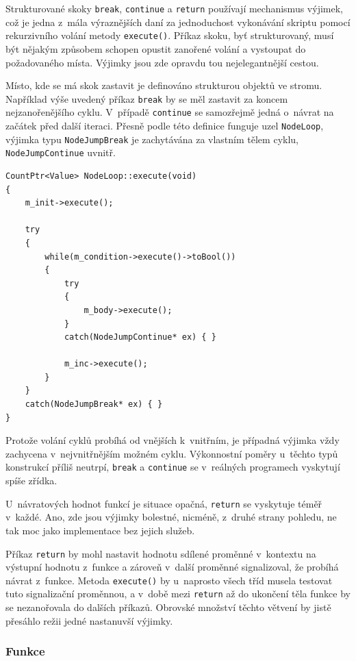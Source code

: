\documentclass[11pt,twoside,a4paper]{book}
\begin{document}
Strukturované skoky \texttt{break}, \texttt{continue} a \texttt{return} používají mechanismus výjimek, což je jedna z~mála výraznějších daní za jednoduchost vykonávání skriptu pomocí rekurzivního volání metody \texttt{execute()}. Příkaz skoku, byť strukturovaný, musí být nějakým způsobem schopen opustit zanořené volání a vystoupat do požadovaného místa. Výjimky jsou zde opravdu tou nejelegantnější cestou.

Místo, kde se má skok zastavit je definováno strukturou objektů ve stromu. Například výše uvedený příkaz \texttt{break} by se měl zastavit za koncem nejzanořenějšího cyklu. V~případě \texttt{continue} se samozřejmě jedná o~návrat na začátek před další iteraci. Přesně podle této definice funguje uzel \texttt{NodeLoop}, výjimka typu \texttt{NodeJumpBreak} je zachytávána za vlastním tělem cyklu, \texttt{NodeJumpContinue} uvnitř.

\begin{verbatim}
CountPtr<Value> NodeLoop::execute(void)
{
    m_init->execute();

    try
    {
        while(m_condition->execute()->toBool())
        {
            try
            {
                m_body->execute();
            }
            catch(NodeJumpContinue* ex) { }

            m_inc->execute();
        }
    }
    catch(NodeJumpBreak* ex) { }
}
\end{verbatim}

Protože volání cyklů probíhá od vnějších k~vnitřním, je případná výjimka vždy zachycena v~nejvnitřnějším možném cyklu. Výkonnostní poměry u~těchto typů konstrukcí příliš neutrpí, \texttt{break} a \texttt{continue} se v~reálných programech vyskytují spíše zřídka.

U~návratových hodnot funkcí je situace opačná, \texttt{return} se vyskytuje téměř v~každé. Ano, zde jsou výjimky bolestné, nicméně, z~druhé strany pohledu, ne tak moc jako implementace bez jejich služeb.

Příkaz \texttt{return} by mohl nastavit hodnotu sdílené proměnné v~kontextu na výstupní hodnotu z~funkce a zároveň v~další proměnné signalizoval, že probíhá návrat z~funkce. Metoda \texttt{execute()} by u~naprosto všech tříd musela testovat tuto signalizační proměnnou, a v~době mezi \texttt{return} až do ukončení těla funkce by se nezanořovala do dalších příkazů. Obrovské množství těchto větvení by jistě přesáhlo režii jedné nastanuvší výjimky.


\subsubsection{Funkce}
\end{document}
